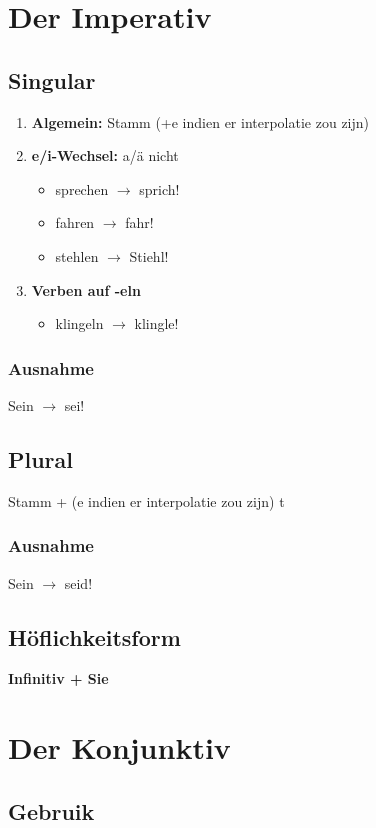 \documentclass[main.tex]{subfiles}
\begin{document}
\section{Der Imperativ}
\subsection{Singular}
\begin{enumerate}
\item \textbf{Algemein:} Stamm (+e indien er interpolatie zou zijn)

\item \textbf{e/i-Wechsel:} a/ä nicht
	\begin{itemize}
	\item sprechen $\rightarrow$ sprich!
	\item fahren $\rightarrow$ fahr!
	\item stehlen $\rightarrow$ Stiehl!
	\end{itemize}

\item \textbf{Verben auf -eln}
	\begin{itemize}
	\item klingeln $\rightarrow$ klingle!
	\end{itemize}
\end{enumerate}
\subsubsection{Ausnahme}
Sein $\rightarrow$ sei!
\subsection{Plural}
Stamm + (e indien er interpolatie zou zijn) t
\subsubsection{Ausnahme}
Sein $\rightarrow$ seid!
\subsection{Höflichkeitsform}
\textbf{Infinitiv + Sie}

\section{Der Konjunktiv}
\subsection{Gebruik}
\end{document}
